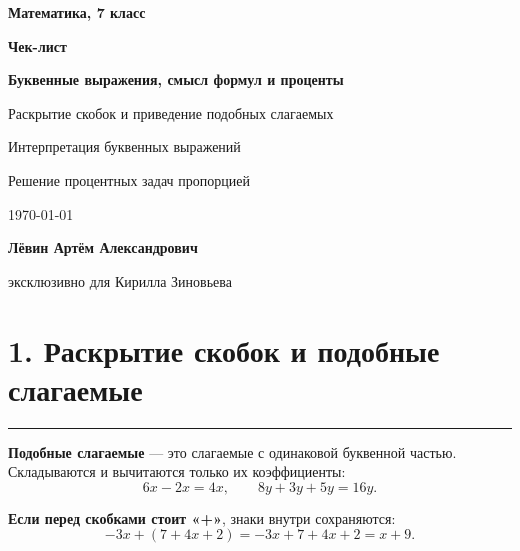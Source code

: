 \documentclass[a4paper,12pt]{article}
\newcommand{\sectionline}{\vspace{-0.35em}\noindent\textcolor{accent}{\rule{\linewidth}{0.6pt}}\vspace{0.35em}}
\newcommand{\key}[1]{\textcolor{darkaccent}{\textbf{#1}}}
\begin{document}
\begin{titlepage}
\thispagestyle{empty}
\centering
\vspace*{18mm}

{\Large\textcolor{darkaccent}{\textbf{Математика, 7 класс}}}\par
\vspace{12mm}

{\Huge\textbf{Чек-лист}}\par
\vspace{5mm}

{\LARGE\textcolor{accent}{\textbf{Буквенные выражения, смысл формул и проценты}}}\par
\vspace{10mm}

{\large
Раскрытие скобок и приведение подобных слагаемых\par
Интерпретация буквенных выражений\par
Решение процентных задач пропорцией\par}

\vfill

{\large \today}\par
\vspace{10mm}

{\large\textbf{Лёвин Артём Александрович}}\par
{\large эксклюзивно для Кирилла Зиновьева}\par

\vspace{12mm}


\end{titlepage}

\section*{1. Раскрытие скобок и подобные слагаемые}
\sectionline

\key{Подобные слагаемые} --- это слагаемые с одинаковой буквенной частью.
Складываются и вычитаются только их коэффициенты:
\[
6x-2x=4x,
\qquad
8y+3y+5y=16y.
\]

\key{Если перед скобками стоит «+»}, знаки внутри сохраняются:
\[
-3x+(7+4x+2)
=
-3x+7+4x+2
=
x+9.
\]
\end{document}
